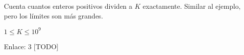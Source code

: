 Cuenta cuantos enteros positivos dividen a \(K\) exactamente. Similar al ejemplo, pero los límites son más grandes.

\begin{plimits}	
	\item \(1\leq K \leq 10^9\)
\end{plimits}

Enlace: 3 [TODO]
